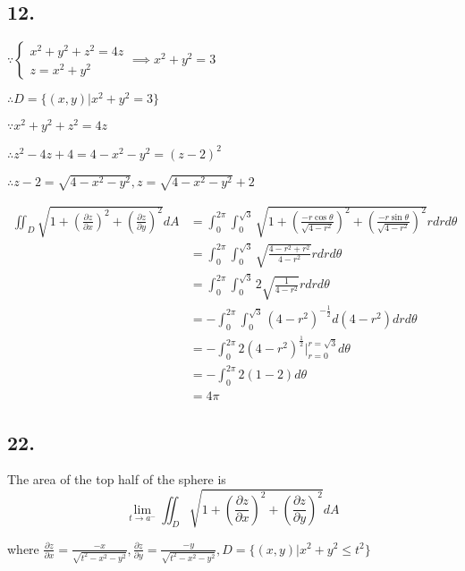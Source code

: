 \documentclass{article}
\begin{document}
  \subsection*{12. }

  $\because \left\{ \begin{array}{ll}  x^2+y^2+z^2=4z \\ z = x^2 + y^2  \end{array}\right. \implies x^2 + y^2 = 3$

  $\therefore D = \{ (x, y) | x^2 + y^2 = 3 \}$

  $\because x^2 + y^2 + z^2 = 4z$

  $\therefore z^2 - 4z + 4 = 4 - x^2 - y^2 = (z-2)^2$

  $\therefore z - 2 = \sqrt{4 - x^2 - y^2}, z = \sqrt{4 - x^2 - y^2} + 2$

  $$\begin{aligned}
    \iint_D \sqrt{1 + (\frac{\partial z}{\partial x})^2 + (\frac{\partial z}{\partial y})^2} dA &=  \int_0^{2\pi} \int_0^{\sqrt 3} \sqrt{1 + (\frac{-r\cos \theta}{\sqrt{4-r^2}})^2 + (\frac{-r\sin \theta}{\sqrt{4-r^2}})^2} r dr d\theta \\
    &= \int_0^{2\pi} \int_0^{\sqrt 3} \sqrt{\frac{4-r^2+r^2}{4-r^2}} r dr d\theta \\
    &= \int_0^{2\pi} \int_0^{\sqrt 3} 2\sqrt{\frac{1}{4-r^2}}r dr d\theta \\
    &= -\int_0^{2\pi} \int_0^{\sqrt 3} (4-r^2)^{-\frac 1 2} d(4-r^2) dr d\theta \\
    &= -\int_0^{2\pi}  2(4-r^2)^{\frac 1 2}\biggl|_{r=0}^{r=\sqrt 3} d\theta \\
    &= -\int_0^{2\pi} 2(1-2)d\theta \\
    &= 4\pi
  \end{aligned}$$

  \subsection*{22. }

  The area of the top half of the sphere is
  $$\lim_{t \to a^-} \iint_D \sqrt{1 + (\frac{\partial z}{\partial x})^2 + (\frac{\partial z}{\partial y})^2} dA$$

  where $\frac{\partial z}{\partial x} = \frac{-x}{\sqrt{t^2 - x^2 - y^2}}, \frac{\partial z}{\partial y} = \frac{-y}{\sqrt{t^2 - x^2 - y^2}}, D = \{ (x, y) | x^2 + y^2 \leq t^2 \}$
\end{document}
